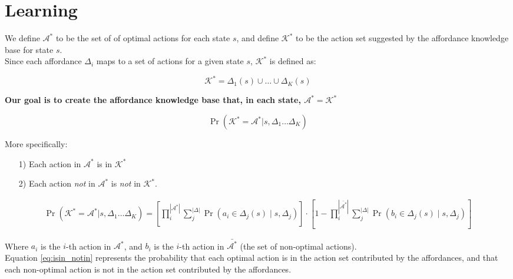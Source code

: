 \documentclass[11pt]{article}
\begin{document}
\section{Learning}

We define $\mathcal{A}^*$ to be the set of of optimal actions for each state $s$, and define $\mathcal{K}^*$ to be the action set suggested by the affordance knowledge base for state $s$. \\

Since each affordance $\Delta_i$ maps to a set of actions for a given state $s$, $\mathcal{K}^*$ is defined as:

\begin{equation}
\mathcal{K}^* = \Delta_1(s) \cup \ldots \cup \Delta_K(s)
\end{equation}
\vspace{2mm}

{\bf Our goal is to create the affordance knowledge base that, in each state, $\mathcal{A}^* = \mathcal{K}^*$}

\begin{equation}
\Pr(\mathcal{K^*} = \mathcal{A}^* | s, \Delta_1 \dots \Delta_K)
\label{eq:master_eq}
\end{equation}

More specifically:
\begin{enumerate}
\item[1)] Each action in $\mathcal{A}^*$ is in $\mathcal{K}^*$
\item[2)] Each action {\it not} in $\mathcal{A}^*$ is {\it not} in $\mathcal{K}^*$.
\end{enumerate}
\begin{align}
\Pr(\mathcal{K^*} = \mathcal{A}^* | s, \Delta_1 \dots \Delta_K)
= \left[\prod_i^{|\mathcal{A}^*|} \sum_j^{|\Delta|} \Pr(a_i \in \Delta_j(s) \mid s, \Delta_j)\right] \cdot
\left[1 - \prod_i^{|\bar{\mathcal{A}^*}|} \sum_j^{|\Delta|} \Pr(b_i \in \Delta_j(s) \mid s, \Delta_j)\right]
\label{eq:isin_notin}
\end{align}

Where $a_i$ is the $i$-th action in $\mathcal{A}^*$, and $b_i$ is the $i$-th action in $\bar{\mathcal{A}^*}$ (the set of non-optimal actions). \\

Equation \ref{eq:isin_notin} represents the probability that each optimal action is in the action set contributed by the affordances, and that each non-optimal action is not in the action set contributed by the affordances. \\
\end{document}
